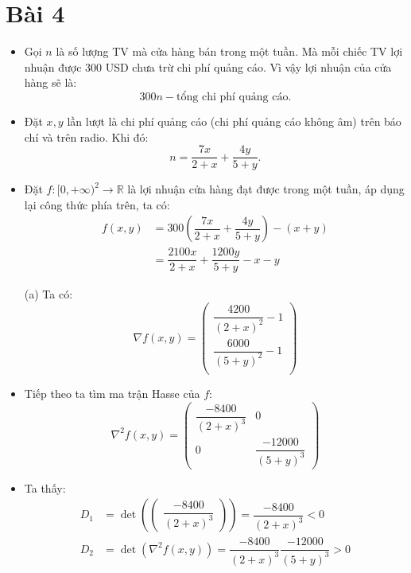 \documentclass[a4paper, 12pt]{report}
\begin{document}
\pagebreak
\section{Bài 4}

\begin{itemize}
    \item Gọi $n$ là số lượng TV mà cửa hàng bán trong một tuần. Mà mỗi chiếc TV lợi nhuận được 300 USD chưa trừ chi phí quảng cáo. Vì vậy lợi nhuận của cửa hàng sẽ là:
    $$
    300n - \text{tổng chi phí quảng cáo}.
    $$

    \item Đặt $x, y$ lần lượt là chi phí quảng cáo (chi phí quảng cáo không âm) trên báo chí và trên radio. Khi đó:
    $$
    n = \dfrac{7x}{2+x} + \dfrac{4y}{5+y}.
    $$

    \item Đặt $f: [0, +\infty)^2 \to \mathbb{R}$ là lợi nhuận cửa hàng đạt được trong một tuần, áp dụng lại công thức phía trên, ta có:
    $$
    \begin{aligned}
    f(x, y) &= 300 \left(\dfrac{7x}{2+x} + \dfrac{4y}{5+y}\right) - (x+y) \\
    &= \dfrac{2100x}{2 + x} + \dfrac{1200y}{5+y} - x - y
    \end{aligned}
    $$

    \item[(a)] Ta có:
    $$
    \nabla f(x, y) = \begin{pmatrix}
        \dfrac{4200}{(2 + x)^2} -1 \\
        \dfrac{6000}{(5 + y)^2}-1 \\
    \end{pmatrix}
    $$

    \item Tiếp theo ta tìm ma trận Hasse của $f$:
    $$
    \nabla^2 f(x, y) = \begin{pmatrix}
        \dfrac{-8400}{(2 + x)^3} & 0 \\
        0 & \dfrac{-12000}{(5 + y)^3}
    \end{pmatrix}
    $$

    \item Ta thấy:
    $$
    \begin{aligned}
        D_1 &= \det \left( \begin{pmatrix}
            \dfrac{-8400}{(2+x)^3} 
        \end{pmatrix} \right) = \dfrac{-8400}{(2+x)^3} < 0 \\
        D_2 &= \det(\nabla^2 f(x, y)) = \dfrac{-8400}{(2+x)^3}\dfrac{-12000}{(5+y)^3} > 0
    \end{aligned}
    $$


\end{itemize}
\end{document}
